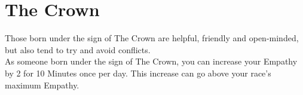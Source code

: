 \section{The Crown}

Those born under the sign of The Crown are helpful, friendly and open-minded, but also tend to try and avoid conflicts.\\
As someone born under the sign of The Crown, you can increase your Empathy by 2 for 10 Minutes once per day. This increase can go above your race's maximum Empathy.\\